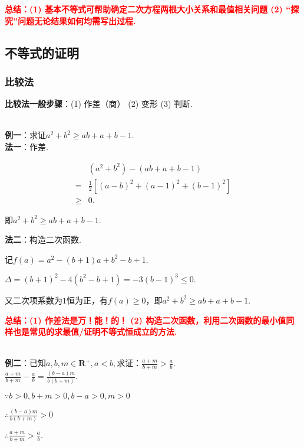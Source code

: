 \documentclass[8pt]{article}
\begin{document}
					\textcolor{red}{\textbf{总结：(1) 基本不等式可帮助确定二次方程两根大小关系和最值相关问题 (2) “探究”问题无论结果如何均需写出过程.}}

		\newpage
		\subsection{不等式的证明}
			\subsubsection{比较法}
				\textbf{比较法一般步骤}：(1) 作差（商） (2) 变形 (3) 判断.

				~\\

				\textbf{例一}：求证$a^2+b^2\geq ab+a+b-1$.
					~\\

					\textbf{法一}：作差.

					$$
					\begin{array}{cl}
						&(a^2+b^2)-(ab+a+b-1)\\
					=	&\displaystyle \frac{1}{2}\left[(a-b)^2+(a-1)^2+(b-1)^2\right]\\
					\geq&0.
					\end{array}
					$$

					即$a^2+b^2\geq ab+a+b-1$.

					\textbf{法二}：构造二次函数.

					记$f(a)=a^2-(b+1)a+b^2-b+1.$

					$\Delta=(b+1)^2-4(b^2-b+1)=-3(b-1)^3\leq 0.$

					又二次项系数为$1$恒为正，有$f(a)\geq 0$，即$a^2+b^2\geq ab+a+b-1$.

					\textcolor{red}{\textbf{总结：(1) 作差法是万！能！的！ (2) 构造二次函数，利用二次函数的最小值同样也是常见的求最值/证明不等式恒成立的方法.}}

				~\\

				\textbf{例二}：已知$a, b, m\in\mathbf{R}^{+}, a<b,$求证：$\displaystyle\frac{a+m}{b+m}>\frac{a}{b}.$
					~\\

					$\displaystyle \frac{a+m}{b+m}-\frac{a}{b}=\frac{(b-a)m}{b(b+m)}.$

					$\because b>0, b+m>0, b-a>0, m>0$

					$\therefore \displaystyle \frac{(b-a)m}{b(b+m)}>0$

					$\therefore \displaystyle \frac{a+m}{b+m}>\frac{a}{b}.$
\end{document}
